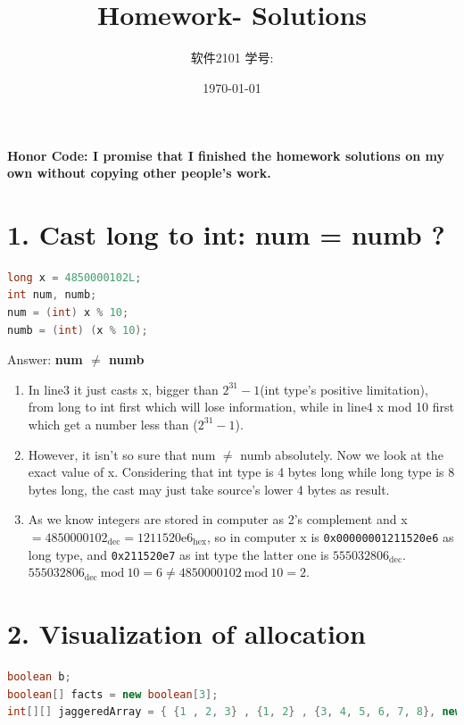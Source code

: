 \documentclass[11pt]{article}  %
\title{\vspace{-4cm}\CourseCodeName \space
        \Session \protect\\  Homework-\textbf{\Homework} Solutions}
\author{软件2101 \Name \space 学号: \SID}
\date{\today}
\begin{document}
\maketitle

\textbf{Honor Code: I promise that I finished the homework solutions on my own without copying other people's 
    work.}

\section*{1. Cast long to int: num = numb ?}

\begin{lstlisting}[language = Java]
long x = 4850000102L;
int num, numb;
num = (int) x % 10;
numb = (int) (x % 10);
\end{lstlisting}
   
Answer: \textbf{num $\mathbf{\neq}$ numb} 
\begin{enumerate}
    \item In line3 it just casts x, bigger than $2^{31} - 1$(int type's positive limitation), from long to int first 
        which will lose information, while in line4 x mod 10 first which get a number less than ($2^{31} - 1$).
    \item However, it isn't so sure that num $\mathbf{\neq}$ numb absolutely. Now we look at the exact value of x.
        Considering that int type is 4 bytes long while long type is 8 bytes long, the cast may just take source's lower 4 bytes as result. 
    \item As we know integers are stored in computer as 2's complement and x $ = 4850000102_{\text{dec}} = 1211520\text{e}6_{\text{hex}}$, so in computer 
        x is \lstinline{0x00000001211520e6} as long type, and \lstinline{0x211520e7} as int type the latter one is $555032806_{\text{dec}}$.
        $555032806_{\text{dec}} ~ \text{mod} ~ 10 = 6 \neq 4850000102 ~ \text{mod} ~ 10 = 2$.
\end{enumerate}

\section*{2. Visualization of allocation}

\begin{lstlisting}[language = Java]
boolean b;
boolean[] facts = new boolean[3];
int[][] jaggeredArray = { {1 , 2, 3} , {1, 2} , {3, 4, 5, 6, 7, 8}, new int[10] };
\end{lstlisting}
\end{document}
